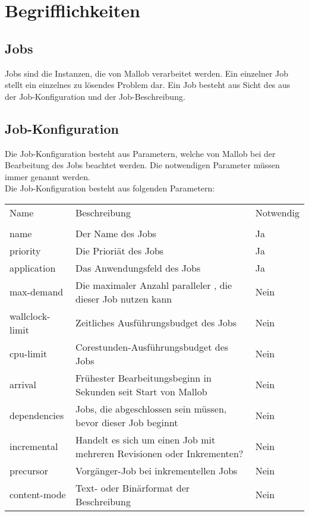 \section{Begrifflichkeiten}

\subsection{Jobs}
\label{B:Jobs}
Jobs sind die Instanzen, die von \gls{Mallob} verarbeitet werden. Ein einzelner Job stellt ein einzelnes zu lösendes Problem dar. Ein Job besteht aus Sicht des  aus der Job-Konfiguration und der Job-Beschreibung.

\subsection{Job-Konfiguration}
\label{B:Job-Konfiguration}
Die Job-Konfiguration besteht aus Parametern, welche von \gls{Mallob} bei der Bearbeitung des Jobs beachtet werden. Die notwendigen Parameter müssen immer genannt werden.\\
Die Job-Konfiguration besteht aus folgenden Parametern: \\

\begin{tabular}{lL{0.6\textwidth}l}
        Name & Beschreibung & Notwendig\\
        \\
        name & Der Name des Jobs & Ja\\
        priority & Die Prioriät des Jobs & Ja\\
        application & Das Anwendungsfeld des Jobs & Ja\\ 
        max-demand & Die maximaler Anzahl paralleler , die dieser Job nutzen kann & Nein\\
        wallclock-limit & Zeitliches Ausführungsbudget des Jobs & Nein\\
        cpu-limit & Corestunden-Ausführungsbudget des Jobs & Nein\\
        arrival & Frühester Bearbeitungsbeginn in Sekunden seit Start von \gls{Mallob} & Nein\\
        dependencies & Jobs, die abgeschlossen sein müssen, bevor dieser Job beginnt & Nein\\
        incremental & Handelt es sich um einen Job mit mehreren Revisionen oder Inkrementen? &  Nein\\
        precursor & Vorgänger-Job bei inkrementellen Jobs & Nein\\
        content-mode & Text- oder Binärformat der Beschreibung & Nein\\
    \end{tabular} 
    
